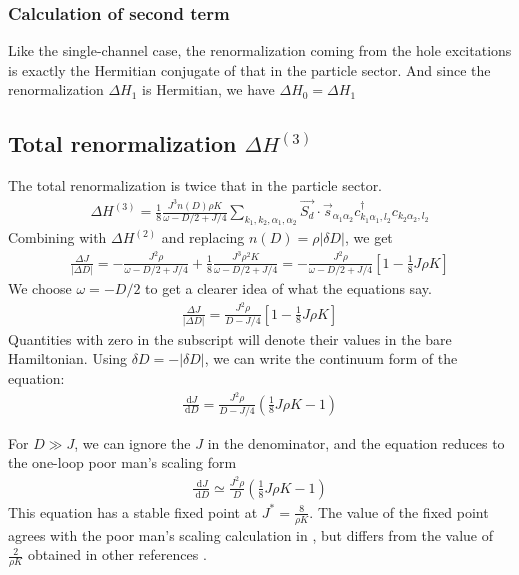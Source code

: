 \documentclass{revtex4-2}
\begin{document}
\subsubsection{Calculation of second term}
Like the single-channel case, the renormalization coming from the hole excitations is exactly the Hermitian conjugate of that in the particle sector. And since the renormalization \(\Delta H_1\) is Hermitian, we have \(\Delta H_0 = \Delta H_1\)

\subsection{Total renormalization \(\Delta H^{(3)}\)}
The total renormalization is twice that in the particle sector.
\begin{align}
	\Delta H^{(3)} = \frac{1}{8}\frac{J^3 n(D) \rho K}{\omega - D/2 + J/4} \sum_{k_1,k_2,\alpha_1,\alpha_2} \vec{S_d}\cdot\vec{s}_{\alpha_1 \alpha_2} c^\dagger_{k_1\alpha_1,l_2}c_{k_2 \alpha_2,l_2}
\end{align}
Combining with \(\Delta H^{(2)}\) and replacing \(n(D) = \rho |\delta D|\), we get
\begin{align}
	\frac{\Delta J}{|\Delta D|} = -\frac{J^2 \rho}{\omega - D/2 + J/4} + \frac{1}{8}\frac{J^3 \rho^2 K}{\omega - D/2 + J/4} = -\frac{J^2 \rho}{\omega - D/2 + J/4}\left[1 - \frac{1}{8}J\rho K\right] 
\end{align}
We choose \(\omega = -D/2\) to get a clearer idea of what the equations say. 
\begin{align}
	\label{mchannel}
	\frac{\Delta J}{|\Delta D|} = \frac{J^2 \rho}{D - J/4}\left[1 - \frac{1}{8}J\rho K\right] 
\end{align}
Quantities with zero in the subscript will denote their values in the bare Hamiltonian. Using \(\delta D = -|\delta D|\), we can write the continuum form of the equation:
\begin{align}
	\label{rg_beta}
	\frac{\:\mathrm{d}J}{\:\mathrm{d}D} = \frac{J^2 \rho}{D - J/4}\left(\frac{1}{8}J\rho K - 1\right)
\end{align}

For \(D \gg J\), we can ignore the \(J\) in the denominator, and the equation reduces to the one-loop poor man's scaling form
\begin{align}
	\label{pms_mchannel}
	\frac{\:\mathrm{d}J}{\:\mathrm{d}D} \simeq  \frac{J^2 \rho}{D}\left(\frac{1}{8}J\rho K - 1\right)
\end{align}
This equation has a stable fixed point at \(J^* = \frac{8}{\rho K}\). The value of the fixed point agrees with the poor man's scaling calculation in \cite{tripathi2018landau}, but differs from the value of \(\frac{2}{\rho K}\) obtained in other references \cite{Kuramoto1998,Kogan_2018}.
\end{document}
